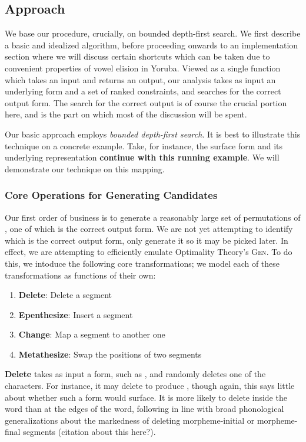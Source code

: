 \documentclass[12pt]{article}
\begin{document}
\subsection{Approach}
\label{subsec:approach}

We base our procedure, crucially, on bounded depth-first search. We first
describe a basic and idealized algorithm, before proceeding onwards to an
implementation section where we will discuss certain shortcuts which can be
taken due to convenient properties of vowel elision in Yoruba. Viewed as a
single function which takes an input and returns an output, our analysis 
takes as input an underlying form and a set of ranked constraints, and
searches for the correct output form. The search for the correct output is
of course the crucial portion here, and is the part on which most of the
discussion will be spent.

Our basic approach employs \textit{bounded depth-first search}. It is best to
illustrate this technique on a concrete example. Take, for instance, the
surface form \textipa{[sol\'u]} and its underlying representation
 \textbf{continue with this running example}. We will
demonstrate our technique on this mapping.

\subsubsection{Core Operations for Generating Candidates}

Our first order of business is to generate a reasonably large set of
permutations of , one of which is the correct output form.
We are not yet attempting to identify which is the correct output form, only
generate it so it may be picked later. In effect, we are attempting to
efficiently emulate Optimality Theory's \textsc{Gen}. To do this, we intoduce
the following core transformations; we model each of these transformations as
functions of their own:

\begin{enumerate}
    \item \textbf{Delete}: Delete a segment
    \item \textbf{Epenthesize}: Insert a segment
    \item \textbf{Change}: Map a segment to another one
    \item \textbf{Metathesize}: Swap the positions of two segments
\end{enumerate}

\textbf{Delete} takes as input a form, such as \textipa{[sol\'u]}, and
randomly deletes one of the characters. For instance, it may delete
\textipa{[o]} to produce \textipa{[sl\'u]}, though again, this says little
about whether such a form would surface. It is more likely to delete inside the
word than at the edges of the word, following in line with broad phonological
generalizations about the markedness of deleting morpheme-initial or
morpheme-final segments (citation about this here?).
\end{document}

